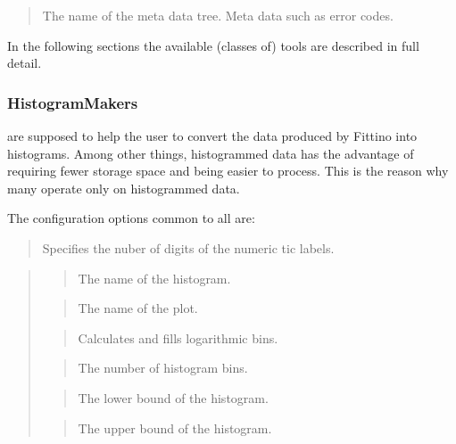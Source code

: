 \documentclass[letterpaper,10pt,english]{sphinxmanual}
\begin{document}
\begin{quote}

The name of the meta data tree. Meta data such as error codes.
\end{quote}

In the following sections the available (classes of) tools are described in full detail.


\subsubsection{HistogramMakers}
\label{histogrammakers:histogrammakers}\label{histogrammakers::doc}
 are supposed to help the user to convert the data produced by Fittino into
histograms. Among other things, histogrammed data has the advantage of requiring fewer storage space
and being easier to process. This is the reason why many  operate only on histogrammed
data.

The configuration options common to all  are:

\begin{quote}

Specifies the nuber of digits of the numeric tic labels.
\end{quote}

\begin{quote}

\begin{quote}

The name of the histogram.
\end{quote}

\begin{quote}

The name of the plot.
\end{quote}

\begin{quote}

Calculates and fills logarithmic bins.
\end{quote}

\begin{quote}

The number of histogram bins.
\end{quote}

\begin{quote}

The lower bound of the histogram.
\end{quote}

\begin{quote}

The upper bound of the histogram.
\end{quote}
\end{quote}
\end{document}
